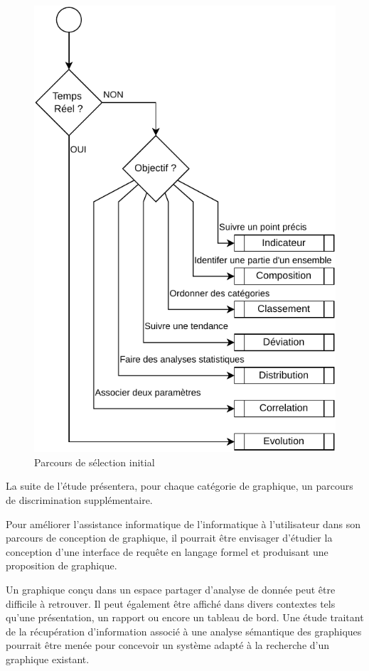 \documentclass[a4paper,12pt]{article}
\begin{document}
\begin{multicols}{2}
\begin{figure}[H]
\centering
\includegraphics[width=.9\linewidth]{./img/select-filter.pdf}
\caption{\label{fig:orgd2c0154}Parcours de sélection initial}
\end{figure}

La suite de l'étude présentera, pour chaque catégorie de graphique, un parcours de discrimination supplémentaire.

Pour améliorer l'assistance informatique de l'informatique  à l'utilisateur dans son parcours de conception de graphique, il pourrait être envisager d'étudier la conception d'une interface de requête en langage formel et produisant une proposition de graphique.

Un graphique conçu dans un espace partager d'analyse de donnée peut être difficile à retrouver. Il peut également être affiché dans divers contextes tels qu'une présentation, un rapport ou encore un tableau de bord. Une étude traitant de la récupération d'information associé à une analyse sémantique des graphiques pourrait être menée pour concevoir un système adapté à la recherche d'un graphique existant.

\end{multicols}
\end{document}
